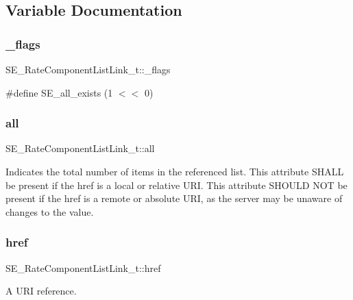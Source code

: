 \subsection{Variable Documentation}
\mbox{\label{group__RateComponentListLink_gab5a566e23c1feca5b7edf66e81163c59}} 
\subsubsection{\texorpdfstring{\+\_\+flags}{\_flags}}
{\footnotesize\ttfamily S\+E\+\_\+\+Rate\+Component\+List\+Link\+\_\+t\+::\+\_\+flags}

\#define S\+E\+\_\+all\+\_\+exists (1 $<$$<$ 0) \mbox{\label{group__RateComponentListLink_ga2437207ebab9fb065490fd11d4f52902}} 
\subsubsection{\texorpdfstring{all}{all}}
{\footnotesize\ttfamily S\+E\+\_\+\+Rate\+Component\+List\+Link\+\_\+t\+::all}

Indicates the total number of items in the referenced list. This attribute S\+H\+A\+LL be present if the href is a local or relative U\+RI. This attribute S\+H\+O\+U\+LD N\+OT be present if the href is a remote or absolute U\+RI, as the server may be unaware of changes to the value. \mbox{\label{group__RateComponentListLink_ga30ee84ebe24949b38c65f5dba0695720}} 
\subsubsection{\texorpdfstring{href}{href}}
{\footnotesize\ttfamily S\+E\+\_\+\+Rate\+Component\+List\+Link\+\_\+t\+::href}

A U\+RI reference. 